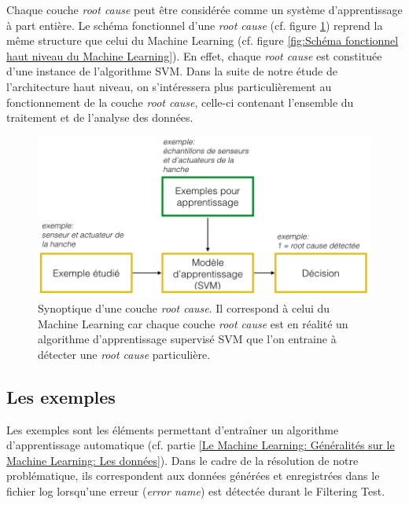 Chaque couche \emph{root cause} peut être considérée comme un système d'apprentissage à part entière. Le schéma fonctionnel d'une \emph{root cause} (cf. figure 	\ref{fig:Synoptique d'une couche root cause}) reprend la même structure que celui du Machine Learning (cf. figure \ref{fig:Schéma fonctionnel haut niveau du Machine Learning}). En effet, chaque \emph{root cause} est constituée d'une instance de l'algorithme SVM. Dans la suite de notre étude de l'architecture haut niveau, on s'intéressera plus particulièrement  au fonctionnement de la couche \emph{root cause}, celle-ci contenant l'ensemble du traitement et de l'analyse des données.

\begin{figure}[h]
	\centering\includegraphics[width=13cm]{images/exemple_root.png}
	\caption[Synoptique d'une couche root cause]{Synoptique d'une couche \emph{root cause}. Il correspond à celui du Machine Learning car chaque couche \emph{root cause} est en réalité un algorithme d'apprentissage supervisé SVM que l'on entraine à détecter une \emph{root cause} particulière.}
	\label{fig:Synoptique d'une couche root cause}
\end{figure}

\subsection{Les exemples}
\label{Automatisation du processus d'investigation: Achitecture High Level du système proposé: Les exemples}
Les exemples sont les éléments permettant d'entraîner un algorithme d'apprentissage automatique (cf. partie \ref{Le Machine Learning: Généralités sur le Machine Learning: Les données}). Dans le cadre de la résolution de notre problématique, ils correspondent aux données générées et enregistrées dans le fichier log lorsqu'une erreur (\emph{error name}) est détectée durant le Filtering Test.

